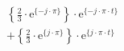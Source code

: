 \[
\begin{split}
&  \left \{ \frac{2}{3} \cdot \textrm{e}^{\{-j \cdot \pi \}} \right \} \cdot \textrm{e}^{\{- j \cdot \pi \cdot t \}}\\
& +\left \{ \frac{2}{3} \cdot \textrm{e}^{\{ j \cdot \pi \}} \right \} \cdot \textrm{e}^{\{  j \cdot \pi \cdot t \}}
\end{split}
\]

